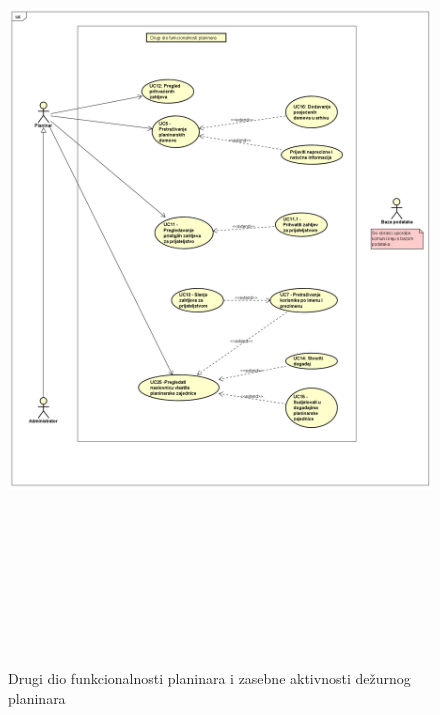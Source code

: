 			\begin{figure}[H]
				\includegraphics[scale=1, width = 165mm, height=220mm]{dijagrami/planinar2.png} %
				\centering
				\caption{Drugi dio funkcionalnosti planinara i zasebne aktivnosti dežurnog planinara}
				\label{fig:UC dijagrami}
			\end{figure}


